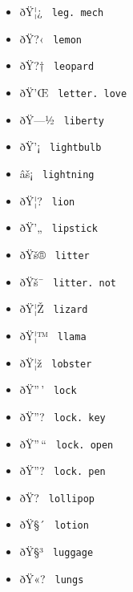 \begin{itemize}
\item
  \label{symbol-leg.mech}{{ ðŸ¦¿ }
  \texttt{\ leg.\ mech\ }}
\item
  \label{symbol-lemon}{{ ðŸ?‹ } \texttt{\ lemon\ }}
\item
  \label{symbol-leopard}{{ ðŸ?† } \texttt{\ leopard\ }}
\item
  \label{symbol-letter.love}{{ ðŸ'Œ }
  \texttt{\ letter.\ love\ }}
\item
  \label{symbol-liberty}{{ ðŸ---½ } \texttt{\ liberty\ }}
\item
  \label{symbol-lightbulb}{{ ðŸ'¡ }
  \texttt{\ lightbulb\ }}
\item
  \label{symbol-lightning}{{ âš¡ }
  \texttt{\ lightning\ }}
\item
  \label{symbol-lion}{{ ðŸ¦? } \texttt{\ lion\ }}
\item
  \label{symbol-lipstick}{{ ðŸ'„ } \texttt{\ lipstick\ }}
\item
  \label{symbol-litter}{{ ðŸš® } \texttt{\ litter\ }}
\item
  \label{symbol-litter.not}{{ ðŸš¯ }
  \texttt{\ litter.\ not\ }}
\item
  \label{symbol-lizard}{{ ðŸ¦Ž } \texttt{\ lizard\ }}
\item
  \label{symbol-llama}{{ ðŸ¦™ } \texttt{\ llama\ }}
\item
  \label{symbol-lobster}{{ ðŸ¦ž } \texttt{\ lobster\ }}
\item
  \label{symbol-lock}{{ ðŸ''\,' } \texttt{\ lock\ }}
\item
  \label{symbol-lock.key}{{ ðŸ''? }
  \texttt{\ lock.\ key\ }}
\item
  \label{symbol-lock.open}{{ ðŸ''\,`` }
  \texttt{\ lock.\ open\ }}
\item
  \label{symbol-lock.pen}{{ ðŸ''? }
  \texttt{\ lock.\ pen\ }}
\item
  \label{symbol-lollipop}{{ ðŸ?­ } \texttt{\ lollipop\ }}
\item
  \label{symbol-lotion}{{ ðŸ§´ } \texttt{\ lotion\ }}
\item
  \label{symbol-luggage}{{ ðŸ§³ } \texttt{\ luggage\ }}
\item
  \label{symbol-lungs}{{ ðŸ«? } \texttt{\ lungs\ }}

\end{itemize}
